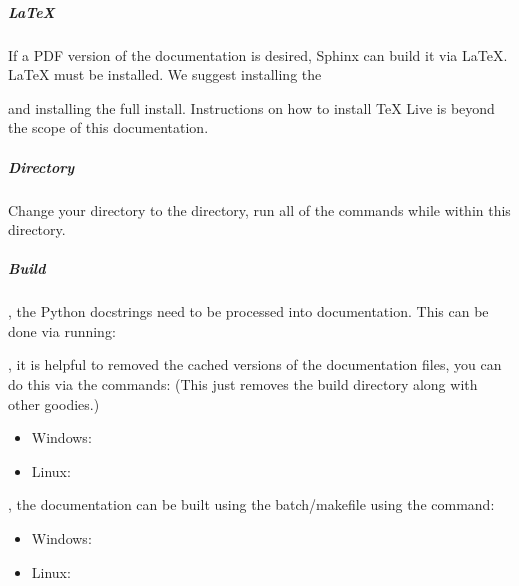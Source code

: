 \documentclass[letterpaper,11pt,english]{sphinxmanual}
\begin{document}
\subparagraph{LaTeX}
\label{\detokenize{technical/installation/documentation:latex}}
\sphinxAtStartPar
If a PDF version of the documentation is desired, Sphinx can build it via
LaTeX. LaTeX must be installed. We suggest installing the
%
\begin{footnote}[28]\sphinxAtStartFootnote
{}
%
\end{footnote} and installing the full install. Instructions on
how to install TeX Live is beyond the scope of this documentation.


\subparagraph{Directory}
\label{\detokenize{technical/installation/documentation:directory}}
\sphinxAtStartPar
Change your directory to the  directory, run all of
the commands while within this directory.


\subparagraph{Build}
\label{\detokenize{technical/installation/documentation:build}}
\sphinxAtStartPar
{}, the Python docstrings need to be processed into documentation. This
can be done via running:

\begin{sphinxVerbatim}[commandchars=\\\{\}]
     
\end{sphinxVerbatim}

\sphinxAtStartPar
{}, it is helpful to removed the cached versions of the documentation
files, you can do this via the commands: (This just removes the build directory
along with other goodies.)
\begin{itemize}
\item {} 
\sphinxAtStartPar
Windows: 

\item {} 
\sphinxAtStartPar
Linux: 

\end{itemize}

\sphinxAtStartPar
{}, the documentation can be built using the batch/makefile using the
command:
\begin{itemize}
\item {} 
\sphinxAtStartPar
Windows: 

\item {} 
\sphinxAtStartPar
Linux: 

\end{itemize}
\end{document}
